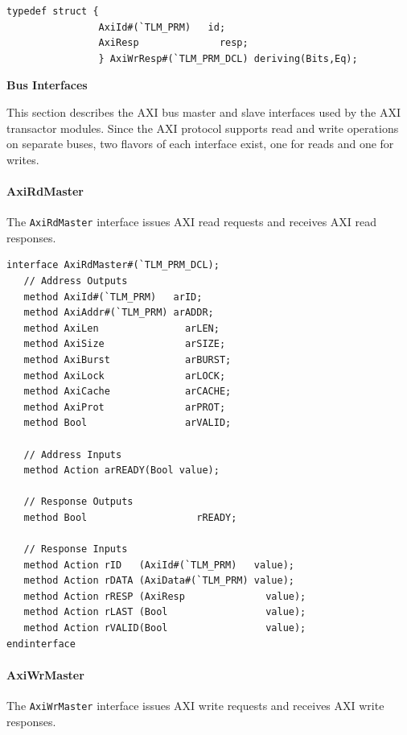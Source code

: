\documentclass[twoside,letterpaper]{article}
\newcommand{\te}[1]{\texttt{#1}}
\begin{document}
\begin{verbatim}
typedef struct {
                AxiId#(`TLM_PRM)   id;
                AxiResp              resp;
                } AxiWrResp#(`TLM_PRM_DCL) deriving(Bits,Eq);
\end{verbatim}


{\bf Bus Interfaces}
\label{sec-AXI-interfaces}

This section describes the AXI bus master and slave interfaces used by
the AXI transactor modules. Since the AXI protocol supports read and
write operations on separate buses, two flavors of each interface
exist, one for reads and one for writes.


\paragraph{\bf AxiRdMaster} The \te{AxiRdMaster} interface issues AXI 
read requests and receives AXI read responses. 

\begin{verbatim}
interface AxiRdMaster#(`TLM_PRM_DCL);
   // Address Outputs
   method AxiId#(`TLM_PRM)   arID;
   method AxiAddr#(`TLM_PRM) arADDR;
   method AxiLen               arLEN;
   method AxiSize              arSIZE;
   method AxiBurst             arBURST;
   method AxiLock              arLOCK;
   method AxiCache             arCACHE;
   method AxiProt              arPROT;
   method Bool                 arVALID;
      
   // Address Inputs
   method Action arREADY(Bool value);
      
   // Response Outputs
   method Bool                   rREADY;
      
   // Response Inputs
   method Action rID   (AxiId#(`TLM_PRM)   value);
   method Action rDATA (AxiData#(`TLM_PRM) value);
   method Action rRESP (AxiResp              value);
   method Action rLAST (Bool                 value);
   method Action rVALID(Bool                 value);
endinterface
\end{verbatim}

\paragraph{\bf AxiWrMaster} The \te{AxiWrMaster} interface issues AXI 
write requests and receives AXI write responses. 
\end{document}

